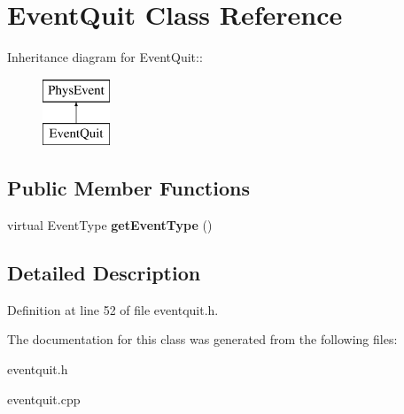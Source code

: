 \hypertarget{classEventQuit}{
\section{EventQuit Class Reference}
\label{d4/da9/classEventQuit}
}
Inheritance diagram for EventQuit::\begin{figure}[H]
\begin{center}
\leavevmode
\includegraphics[height=2cm]{d4/da9/classEventQuit}
\end{center}
\end{figure}
\subsection*{Public Member Functions}
\begin{DoxyCompactItemize}
\item 
\hypertarget{classEventQuit_afedf8e4dfc51f400af67d20ac7ff2085}{
virtual EventType {\bfseries getEventType} ()}
\label{d4/da9/classEventQuit_afedf8e4dfc51f400af67d20ac7ff2085}

\end{DoxyCompactItemize}


\subsection{Detailed Description}


Definition at line 52 of file eventquit.h.

The documentation for this class was generated from the following files:\begin{DoxyCompactItemize}
\item 
eventquit.h\item 
eventquit.cpp\end{DoxyCompactItemize}
